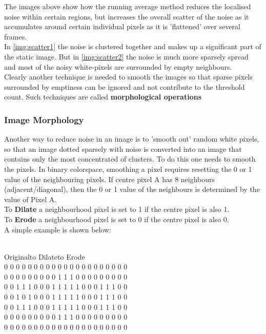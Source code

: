 \documentclass[11pt]{article} %
\newcommand{\tab}{\hspace*{2em}}
\begin{document}
{{The images above show how the running average method reduces the localised noise within certain regions, but increases the overall scatter of the noise as it accumulates around certain individual pixels as it is 'flattened' over several frames.\\\linebreak
\pagebreak In \cref{img:scatter1} the noise is clustered together and makes up a significant part of the static image. But in \cref{img:scatter2} the noise is much more sparsely spread and most of the noisy white-pixels are surrounded by empty neighbours.\\

Clearly another technique is needed to smooth the images so that sparse pixels surrounded by emptiness can be ignored and not contribute to the threshold count. Such techniques are called {\bf morphological operations}

\subsubsection{Image Morphology}\label{kernelmorph}
Another way to reduce noise in an image is to 'smooth out' random white pixels, so that an image dotted sparsely with noise is converted into an image that contains only the most concentrated of clusters.  To do this one needs to smooth the pixels.
In binary colorspace, smoothing a pixel requires resetting the 0 or 1 value of the neighbouring pixels. If centre pixel A has 8 neighbours (adjacent/diagonal), then the 0 or 1 value of the neighbours is determined by the value of Pixel A.\\
To {\bf Dilate} a neighbourhood pixel is set to 1 if the centre pixel is also 1.\\
To {\bf Erode} a neighbourhood pixel is set to 0 if the centre pixel is also 0.\\
A simple example is shown below:

\begin{center}
\vspace{-20pt}
\begin{frame}{}\\
Original\tab\tab to Dilate\tab to Erode\tab\\
\tiny{
0 0 0 0 0 0 0 \tab\tab0 0 0 0 0 0 0 \tab\tab0 0 0 0 0 0 0 \\
0 0 0 0 0 0 0 \tab\tab0 0 1 1 1 0 0 \tab\tab0 0 0 0 0 0 0 \\
0 0 1 1 1 0 0 \tab\tab0 1 1 1 1 1 0 \tab\tab0 0 1 1 1 0 0 \\
0 0 1 0 1 0 0 \tab\tab0 1 1 1 1 1 0 \tab\tab0 0 1 1 1 0 0 \\
0 0 1 1 1 0 0 \tab\tab0 1 1 1 1 1 0 \tab\tab0 0 1 1 1 0 0 \\
0 0 0 0 0 0 0 \tab\tab0 0 1 1 1 0 0 \tab\tab0 0 0 0 0 0 0 \\
0 0 0 0 0 0 0 \tab\tab0 0 0 0 0 0 0 \tab\tab0 0 0 0 0 0 0 \\
}
\end{frame}
\end{center}

}}
\end{document}
